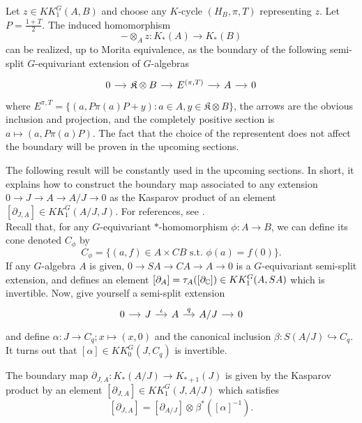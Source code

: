 \begin{prop}
Let $z\in KK^G_1(A,B)$ and choose any $K$-cycle $(H_B,\pi,T)$ representing $z$. Let $P=\frac{1+T}{2}$. The induced homomorphism 
\[-\otimes_A z : K_*(A)\rightarrow K_*(B)\]
can be realized, up to Morita equivalence, as the boundary of the following semi-split $G$-equivariant extension of $G$-algebras
\[\begin{tikzcd}[column sep = small] 
0 \arrow{r}& \mathfrak K \otimes B \arrow{r} & E^{(\pi,T)} \arrow{r} & A \arrow{r} & 0\end{tikzcd}\]
where $E^{\pi,T}=\{(a,P\pi(a)P +y) : a\in A , y\in \mathfrak K \otimes B\}$, the arrows are the obvious inclusion and projection, and the completely positive section is $a\mapsto (a, P \pi(a) P)$. The fact that the choice of the representent does not affect the boundary will be proven in the upcoming sections. 
\end{prop}

The following result will be constantly used in the upcoming sections. In short, it explains how to construct the boundary map associated to any extension $0\rightarrow J\rightarrow A \rightarrow A/J \rightarrow 0$ as the Kasparov product of an element $[\partial_{J,A}]\in KK^G_1(A/J,J)$. For references, see \cite{blackadar}.\\

Recall that, for any $G$-equivariant $*$-homomorphism $\phi : A \rightarrow B$, we can define its cone denoted $C_\phi$ by 
\[C_\phi = \{(a,f)\in A\times CB \text{ s.t. } \phi(a)=f(0)\}.\]
If any $G$-algebra $A$ is given, $0\rightarrow SA\rightarrow CA\rightarrow A \rightarrow 0$ is a $G$-equivariant semi-split extension, and defines an element $[\partial_A]=\tau_A([\partial_\mathbb C])\in KK^G_1(A,SA)$ which is invertible. Now, give yourself a semi-split extension 
\[\begin{tikzcd}[column sep = small]0 \arrow{r} & J \arrow{r}{\iota} & A \arrow{r}{q} & A/J \arrow{r}& 0 \end{tikzcd}\] 
and define $\alpha : J\rightarrow C_q ; x\mapsto (x,0)$ and the canonical inclusion $\beta : S (A/J)\hookrightarrow C_q$. It turns out that $[\alpha]\in KK_0^G(J,C_q)$ is invertible.

\begin{prop}
The boundary map $\partial_{J,A} : K_*(A/J)\rightarrow K_{*+1}(J)$ is given by the Kasparov product by an element $[\partial_{J,A}]\in KK^G_1(J,A/J)$ which satisfies 
\[[\partial_{J,A}] = [\partial_{A/J}]\otimes_{} \beta^*([\alpha]^{-1}).\]
\end{prop}


